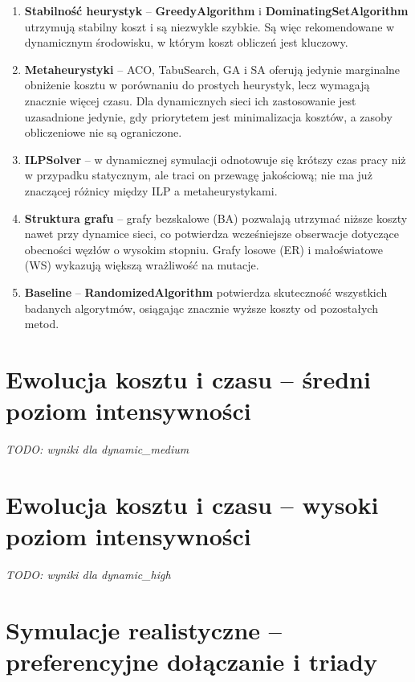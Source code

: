 \begin{enumerate}
\item \textbf{Stabilność heurystyk} -- \textbf{GreedyAlgorithm} i \textbf{DominatingSetAlgorithm} utrzymują stabilny koszt i są niezwykle szybkie. Są więc rekomendowane w dynamicznym środowisku, w którym koszt obliczeń jest kluczowy.

\item \textbf{Metaheurystyki} -- ACO, TabuSearch, GA i SA oferują jedynie marginalne obniżenie kosztu w porównaniu do prostych heurystyk, lecz wymagają znacznie więcej czasu. Dla dynamicznych sieci ich zastosowanie jest uzasadnione jedynie, gdy priorytetem jest minimalizacja kosztów, a zasoby obliczeniowe nie są ograniczone.

\item \textbf{ILPSolver} -- w dynamicznej symulacji odnotowuje się krótszy czas pracy niż w przypadku statycznym, ale traci on przewagę jakościową; nie ma już znaczącej różnicy między ILP a metaheurystykami.

\item \textbf{Struktura grafu} -- grafy bezskalowe (BA) pozwalają utrzymać niższe koszty nawet przy dynamice sieci, co potwierdza wcześniejsze obserwacje dotyczące obecności węzłów o wysokim stopniu. Grafy losowe (ER) i małoświatowe (WS) wykazują większą wrażliwość na mutacje.

\item \textbf{Baseline} -- \textbf{RandomizedAlgorithm} potwierdza skuteczność wszystkich badanych algorytmów, osiągając znacznie wyższe koszty od pozostałych metod.
\end{enumerate}

\section{Ewolucja kosztu i czasu -- średni poziom intensywności}

\emph{TODO: wyniki dla dynamic\_medium}

\section{Ewolucja kosztu i czasu -- wysoki poziom intensywności}

\emph{TODO: wyniki dla dynamic\_high}

\section{Symulacje realistyczne -- preferencyjne dołączanie i triady}

